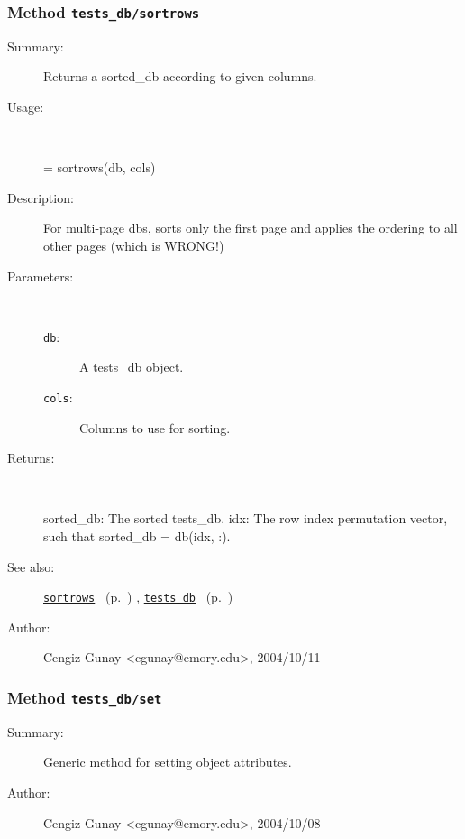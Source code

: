 \subsubsection[Method \texttt{sortrows}]{Method \texttt{tests\_db/sortrows}}%
%
\label{ref_tests_db__sortrows}%
\hypertarget{ref_tests_db__sortrows}{}%
\begin{description}
\item[Summary:]Returns a sorted\_db according to given columns. 
%
\item[Usage:]~%
\begin{lyxcode}%
[sorted\_db, idx] = sortrows(db, cols)
%
\end{lyxcode}%
%
\item[Description:]%
For multi-page dbs, sorts only the first page and applies the ordering 
 to all other pages (which is WRONG!)
\item[Parameters:]~
\begin{description}%
\item[\texttt{db}:]
 A tests\_db object.
\item[\texttt{cols}:]
 Columns to use for sorting.
\end{description}%
%
\item[Returns:]~

	sorted\_db: The sorted tests\_db.
	idx: The row index permutation vector, such that sorted\_db = db(idx, :). 
%
%
\item[See also:]%
\hyperlink{ref_sortrows}{\texttt{sortrows}}%
\ (p.~\pageref{ref_sortrows})%
%
, \hyperlink{ref_tests_db}{\texttt{tests\_db}}%
\ (p.~\pageref{ref_tests_db})%
%
%
\item[Author:]%
Cengiz Gunay <cgunay@emory.edu>, 2004/10/11%
\end{description}
\methodline%
\subsubsection[Method \texttt{set}]{Method \texttt{tests\_db/set}}%
%
\label{ref_tests_db__set}%
\hypertarget{ref_tests_db__set}{}%
\begin{description}
\item[Summary:]Generic method for setting object attributes.
%
%
%
%
%
%
%
\item[Author:]%
Cengiz Gunay <cgunay@emory.edu>, 2004/10/08%
\end{description}
\methodline%

